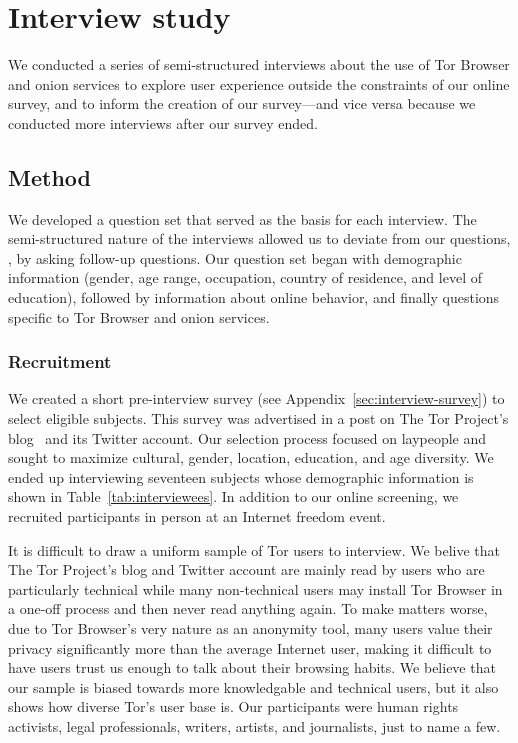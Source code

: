\section{Interview study}
\label{sec:interview-study}

We conducted a series of semi-structured interviews about the use of Tor
Browser and onion services to explore user experience outside the constraints
of our online survey, and to inform the creation of our survey---and vice versa
because we conducted more interviews after our survey ended.

\subsection{Method}

We developed a question set that served as the basis for each interview.  The
semi-structured nature of the interviews allowed us to deviate from our
questions, \eg, by asking follow-up questions.  Our question set began with
demographic information (gender, age range, occupation, country of residence,
and level of education), followed by information about online behavior, and
finally questions specific to Tor Browser and onion services.

\subsubsection{Recruitment}

We created a short pre-interview survey (see
Appendix~\ref{sec:interview-survey}) to select eligible subjects.  This survey
was advertised in a post on The Tor Project's blog~\cite{Winter2017a} and its
Twitter account.  Our selection process focused on laypeople and sought to
maximize cultural, gender, location, education, and age diversity.  We ended up
interviewing seventeen subjects whose demographic information is shown in
Table~\ref{tab:interviewees}.  In addition to our online screening, we
recruited participants in person at an Internet freedom event.

It is difficult to draw a uniform sample of Tor users to interview. We belive
that The Tor Project's blog and Twitter account are mainly read by users who
are particularly technical while many non-technical users may install Tor
Browser in a one-off process and then never read anything again.  To make
matters worse, due to Tor Browser's very nature as an anonymity tool, many
users value their privacy significantly more than the average Internet user,
making it difficult to have users trust us enough to talk about their browsing
habits.  We believe that our sample is biased towards more knowledgable and
technical users, but it also shows how diverse Tor's user base is.  Our
participants were human rights activists, legal professionals, writers,
artists, and journalists, just to name a few.

